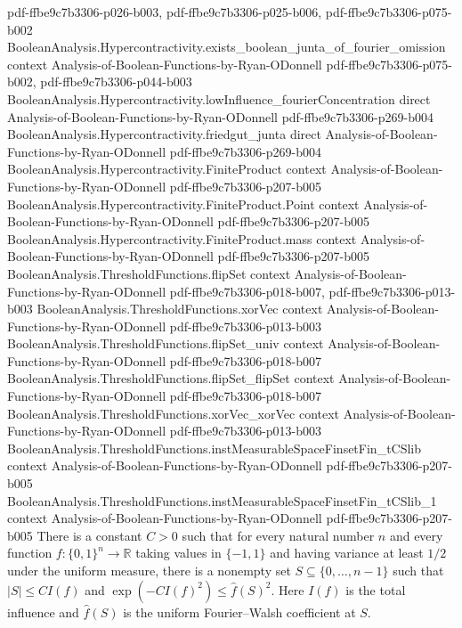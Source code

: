 \begin{theorem}
  {pdf-ffbe9c7b3306-p026-b003,
    pdf-ffbe9c7b3306-p025-b006,
    pdf-ffbe9c7b3306-p075-b002}
\proofstep
  {BooleanAnalysis.Hypercontractivity.exists_boolean_junta_of_fourier_omission}
  {context}
  {Analysis-of-Boolean-Functions-by-Ryan-ODonnell}
  {pdf-ffbe9c7b3306-p075-b002,
    pdf-ffbe9c7b3306-p044-b003}
\proofstep
  {BooleanAnalysis.Hypercontractivity.lowInfluence_fourierConcentration}
  {direct}
  {Analysis-of-Boolean-Functions-by-Ryan-ODonnell}
  {pdf-ffbe9c7b3306-p269-b004}
\proofstep
  {BooleanAnalysis.Hypercontractivity.friedgut_junta}
  {direct}
  {Analysis-of-Boolean-Functions-by-Ryan-ODonnell}
  {pdf-ffbe9c7b3306-p269-b004}
\proofstep
  {BooleanAnalysis.Hypercontractivity.FiniteProduct}
  {context}
  {Analysis-of-Boolean-Functions-by-Ryan-ODonnell}
  {pdf-ffbe9c7b3306-p207-b005}
\proofstep
  {BooleanAnalysis.Hypercontractivity.FiniteProduct.Point}
  {context}
  {Analysis-of-Boolean-Functions-by-Ryan-ODonnell}
  {pdf-ffbe9c7b3306-p207-b005}
\proofstep
  {BooleanAnalysis.Hypercontractivity.FiniteProduct.mass}
  {context}
  {Analysis-of-Boolean-Functions-by-Ryan-ODonnell}
  {pdf-ffbe9c7b3306-p207-b005}
\proofstep
  {BooleanAnalysis.ThresholdFunctions.flipSet}
  {context}
  {Analysis-of-Boolean-Functions-by-Ryan-ODonnell}
  {pdf-ffbe9c7b3306-p018-b007,
    pdf-ffbe9c7b3306-p013-b003}
\proofstep
  {BooleanAnalysis.ThresholdFunctions.xorVec}
  {context}
  {Analysis-of-Boolean-Functions-by-Ryan-ODonnell}
  {pdf-ffbe9c7b3306-p013-b003}
\proofstep
  {BooleanAnalysis.ThresholdFunctions.flipSet_univ}
  {context}
  {Analysis-of-Boolean-Functions-by-Ryan-ODonnell}
  {pdf-ffbe9c7b3306-p018-b007}
\proofstep
  {BooleanAnalysis.ThresholdFunctions.flipSet_flipSet}
  {context}
  {Analysis-of-Boolean-Functions-by-Ryan-ODonnell}
  {pdf-ffbe9c7b3306-p018-b007}
\proofstep
  {BooleanAnalysis.ThresholdFunctions.xorVec_xorVec}
  {context}
  {Analysis-of-Boolean-Functions-by-Ryan-ODonnell}
  {pdf-ffbe9c7b3306-p013-b003}
\proofstep
  {BooleanAnalysis.ThresholdFunctions.instMeasurableSpaceFinsetFin_tCSlib}
  {context}
  {Analysis-of-Boolean-Functions-by-Ryan-ODonnell}
  {pdf-ffbe9c7b3306-p207-b005}
\proofstep
  {BooleanAnalysis.ThresholdFunctions.instMeasurableSpaceFinsetFin_tCSlib_1}
  {context}
  {Analysis-of-Boolean-Functions-by-Ryan-ODonnell}
  {pdf-ffbe9c7b3306-p207-b005}
There is a constant $C>0$ such that for every natural number $n$ and every function
$f:\{0,1\}^n\to\mathbb R$ taking values in $\{-1,1\}$ and having variance at least $1/2$
under the uniform measure, there is a nonempty set $S\subseteq\{0,\ldots,n-1\}$ such
that $|S|\le C I(f)$ and $\exp(-C I(f)^2)\le\widehat f(S)^2$. Here $I(f)$ is the total
influence and $\widehat f(S)$ is the uniform Fourier–Walsh coefficient at $S$.
\end{theorem}

